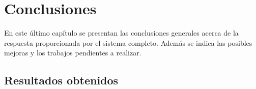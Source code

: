 
\chapter{Conclusiones} %

\label{Chapter5} %

En este último capítulo se presentan las conclusiones generales acerca de la respuesta proporcionada por el sistema completo. Además se indica las posibles mejoras y los trabajos pendientes a realizar.


\section{Resultados obtenidos}



